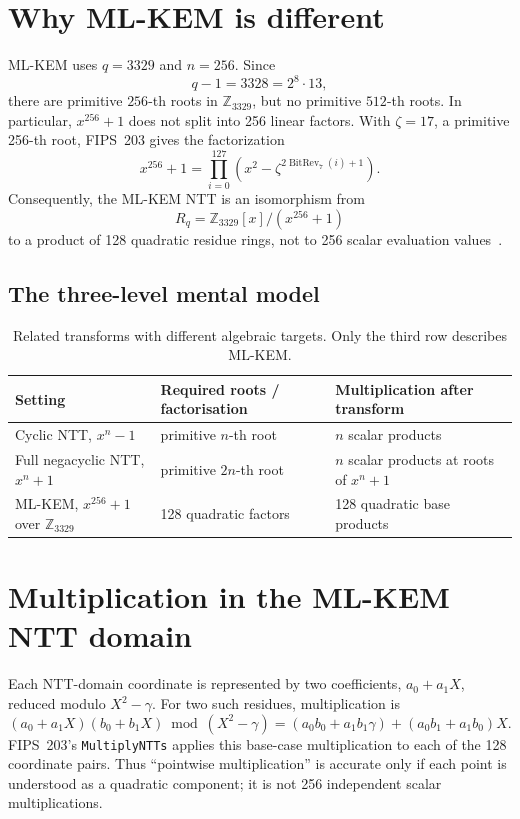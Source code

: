 \section{Why ML-KEM is different}

ML-KEM uses $q=3329$ and $n=256$. Since
\[
q-1=3328=2^8\cdot13,
\]
there are primitive $256$-th roots in $\mathbb{Z}_{3329}$, but no primitive $512$-th roots. In particular, $x^{256}+1$ does not split into 256 linear factors. With $\zeta=17$, a primitive 256-th root, FIPS~203 gives the factorization
\[
x^{256}+1=\prod_{i=0}^{127}\left(x^2-\zeta^{2\operatorname{BitRev}_7(i)+1}\right).
\]
Consequently, the ML-KEM NTT is an isomorphism from
\[
R_q=\mathbb{Z}_{3329}[x]/(x^{256}+1)
\]
to a product of 128 quadratic residue rings, not to 256 scalar evaluation values~\cite[Sec.~4.3]{fips203}.

\subsection{The three-level mental model}

\begin{table}[H]
\centering
\small
\begin{tabular}{p{}p{}p{}}
\toprule
Setting & Required roots / factorisation & Multiplication after transform \\
\midrule
Cyclic NTT, $x^n-1$ & primitive $n$-th root & $n$ scalar products \\
Full negacyclic NTT, $x^n+1$ & primitive $2n$-th root & $n$ scalar products at roots of $x^n+1$ \\
ML-KEM, $x^{256}+1$ over $\mathbb{Z}_{3329}$ & 128 quadratic factors & 128 quadratic base products \\
\bottomrule
\end{tabular}
\caption{Related transforms with different algebraic targets. Only the third row describes ML-KEM.}
\label{tab:ntt-three-settings}
\end{table}

\section{Multiplication in the ML-KEM NTT domain}

Each NTT-domain coordinate is represented by two coefficients, $a_0+a_1X$, reduced modulo $X^2-\gamma$. For two such residues, multiplication is
\[
(a_0+a_1X)(b_0+b_1X)\bmod(X^2-\gamma)
= (a_0b_0+a_1b_1\gamma)+(a_0b_1+a_1b_0)X.
\]
FIPS~203's \texttt{MultiplyNTTs} applies this base-case multiplication to each of the 128 coordinate pairs. Thus ``pointwise multiplication'' is accurate only if each point is understood as a quadratic component; it is not 256 independent scalar multiplications.

